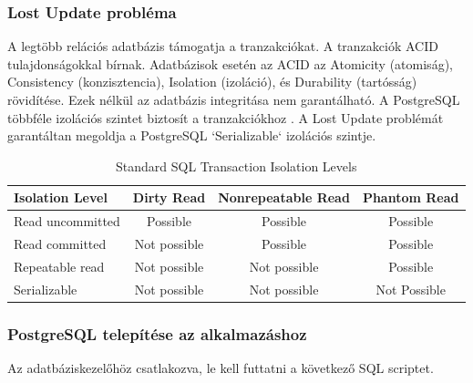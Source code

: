 \subsubsection{Lost Update probléma}
A legtöbb relációs adatbázis támogatja a tranzakciókat. A tranzakciók ACID tulajdonságokkal bírnak.
Adatbázisok esetén az ACID az Atomicity (atomiság), Consistency (konzisztencia), Isolation (izoláció), és Durability (tartósság) rövidítése. Ezek nélkül az adatbázis integritása nem garantálható.
A PostgreSQL többféle izolációs szintet biztosít a tranzakciókhoz \cite{postgresql}. A Lost Update problémát garantáltan megoldja a PostgreSQL `Serializable` izolációs szintje.
\begin{table}[h]
    \centering
    \caption{ Standard SQL Transaction Isolation Levels}
    \begin{tabular}{l|c|c|c|}
Isolation Level & Dirty Read  & Nonrepeatable Read & Phantom Read\\
        \hline
Read uncommitted  & Possible & Possible & Possible \\
\hline
Read committed & Not possible & Possible & Possible \\
\hline
Repeatable read & Not possible & Not possible & Possible \\
\hline
Serializable & Not possible & Not possible & Not Possible \\
        \hline
    \end{tabular}
\end{table}

\subsubsection{PostgreSQL telepítése az alkalmazáshoz}\label{subsubsec:postgresql-telepítése-a-programhoz}

Az adatbáziskezelőhöz csatlakozva, le kell futtatni a következő SQL scriptet.

